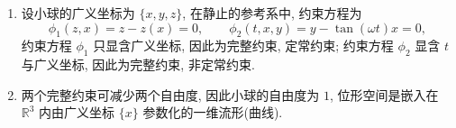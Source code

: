 \begin{solution}
    \begin{enumerate}[label=(\arabic*)]
        \item 设小球的广义坐标为 $\{x, y, z\}$, 在静止的参考系中, 约束方程为
        \[
            \phi_1 (z, x) = z - z(x) = 0, \qquad \phi_2 (t, x, y) = y - \tan (\omega t) x = 0,
        \]
        约束方程 $\phi_1$ 只显含广义坐标, 因此为完整约束, 定常约束; 约束方程 $\phi_2$ 显含 $t$ 与广义坐标, 因此为完整约束, 非定常约束.
        \item 两个完整约束可减少两个自由度, 因此小球的自由度为 $1$, 位形空间是嵌入在 $\mathbb{R}^3$ 内由广义坐标 $\{x\}$ 参数化的一维流形(曲线).
    \end{enumerate}
\end{solution}
